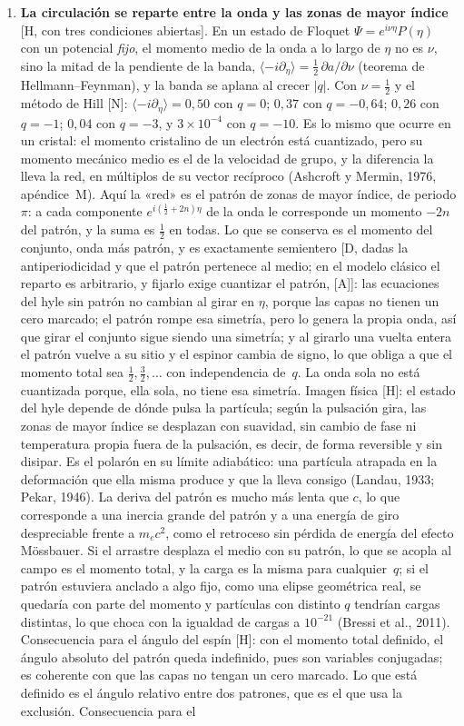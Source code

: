 \documentclass[11pt,a4paper]{article}
\newcommand{\st}[1]{\textup{[#1]}}
\begin{document}
\begin{enumerate}[label=\arabic*.,ref=\arabic*,leftmargin=*]
\item \label{ab:circmedia}\textbf{La circulación se reparte entre la onda y las zonas de mayor índice} \st{H, con tres condiciones abiertas}. En un estado de Floquet $\Psi=e^{i\nu\eta}P(\eta)$ con un potencial \emph{fijo}, el momento medio de la onda a lo largo de $\eta$ no es $\nu$, sino la mitad de la pendiente de la banda, $\langle-i\partial_\eta\rangle=\tfrac12\,\partial a/\partial\nu$ (teorema de Hellmann--Feynman), y la banda se aplana al crecer $|q|$. Con $\nu=\tfrac12$ y el método de Hill \st{N}: $\langle-i\partial_\eta\rangle=0,50$ con $q=0$; $0,37$ con $q=-0,64$; $0,26$ con $q=-1$; $0,04$ con $q=-3$, y $3\times10^{-4}$ con $q=-10$. Es lo mismo que ocurre en un cristal: el momento cristalino de un electrón está cuantizado, pero su momento mecánico medio es el de la velocidad de grupo, y la diferencia la lleva la red, en múltiplos de su vector recíproco (Ashcroft y Mermin, 1976, apéndice~M). Aquí la «red» es el patrón de zonas de mayor índice, de periodo $\pi$: a cada componente $e^{i(\frac12+2n)\eta}$ de la onda le corresponde un momento $-2n$ del patrón, y la suma es $\tfrac12$ en todas. Lo que se conserva es el momento del conjunto, onda más patrón, y es exactamente semientero \st{D, dadas la antiperiodicidad y que el patrón pertenece al medio; en el modelo clásico el reparto es arbitrario, y fijarlo exige cuantizar el patrón, \st{A}}: las ecuaciones del hyle sin patrón no cambian al girar en $\eta$, porque las capas no tienen un cero marcado; el patrón rompe esa simetría, pero lo genera la propia onda, así que girar el conjunto sigue siendo una simetría; y al girarlo una vuelta entera el patrón vuelve a su sitio y el espinor cambia de signo, lo que obliga a que el momento total sea $\tfrac12,\tfrac32,\dots$ con independencia de~$q$. La onda sola no está cuantizada porque, ella sola, no tiene esa simetría. Imagen física \st{H}: el estado del hyle depende de dónde pulsa la partícula; según la pulsación gira, las zonas de mayor índice se desplazan con suavidad, sin cambio de fase ni temperatura propia fuera de la pulsación, es decir, de forma reversible y sin disipar. Es el polarón en su límite adiabático: una partícula atrapada en la deformación que ella misma produce y que la lleva consigo (Landau, 1933; Pekar, 1946). La deriva del patrón es mucho más lenta que $c$, lo que corresponde a una inercia grande del patrón y a una energía de giro despreciable frente a $m_ec^2$, como el retroceso sin pérdida de energía del efecto Mössbauer. Si el arrastre desplaza el medio con su patrón, lo que se acopla al campo es el momento total, y la carga es la misma para cualquier~$q$; si el patrón estuviera anclado a algo fijo, como una elipse geométrica real, se quedaría con parte del momento y partículas con distinto $q$ tendrían cargas distintas, lo que choca con la igualdad de cargas a $10^{-21}$ (Bressi et al., 2011). Consecuencia para el ángulo del espín \st{H}: con el momento total definido, el ángulo absoluto del patrón queda indefinido, pues son variables conjugadas; es coherente con que las capas no tengan un cero marcado. Lo que está definido es el ángulo relativo entre dos patrones, que es el que usa la exclusión. Consecuencia para el 
\end{enumerate}
\end{document}
